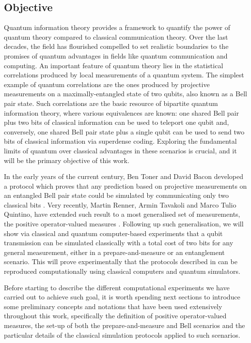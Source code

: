 \subsection{Objective}
Quantum information theory provides a framework to quantify the power of quantum theory compared to classical communication theory. Over the last decades, the field has flourished compelled to set realistic boundaries to the promises of quantum advantages in fields like quantum communication and computing. An important feature of quantum theory lies in the statistical correlations produced by local measurements of a quantum system. The simplest example of quantum correlations are the ones produced by projective measurements on a maximally-entangled state of two qubits, also known as a Bell pair state. Such correlations are the basic resource of bipartite quantum information theory, where various equivalences are known: one shared Bell pair plus two bits of classical information can be used to teleport one  qubit and, conversely, one shared Bell pair state plus a single qubit can be used to send two bits of classical information via superdense coding. Exploring the fundamental limits of quantum over classical advantages in these scenarios is crucial, and it will be the primary objective of this work.
\par
In the early years of the current century, Ben Toner and David Bacon developed a protocol which proves that any prediction based on projective measurements on an entangled Bell pair state could be simulated by communicating only two classical bits \cite{toner2003}. Very recently, Martin Renner, Armin Tavakoli and Marco Tulio Quintino, have extended such result to a most generalised set of measurements, the positive operator-valued measures \cite{renner2022}.
Following up such generalisation, we will show via classical and quantum computer-based experiments that a qubit transmission can be simulated classically with a total cost of two bits for any general measurement, either in a prepare-and-measure or an entanglement scenario. This will prove experimentally that the protocols described in \cite{renner2022} can be reproduced computationally using classical computers and quantum simulators.
\par
Before starting to describe the different computational experiments we have carried out to achieve such goal, it is worth spending next sections to introduce some preliminary concepts and notations that have been used extensively throughout this work, specifically the definition of positive operator-valued measures, the set-up of both the prepare-and-measure and Bell scenarios and the particular details of the classical simulation protocols applied to such scenarios.
\par
